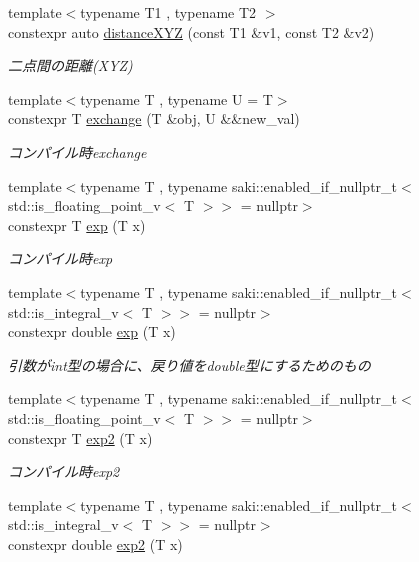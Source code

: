 \begin{DoxyCompactItemize}
{\footnotesize template$<$typename T1 , typename T2 $>$ }\\constexpr auto \mbox{\hyperlink{namespacesaki_a456ead1dd3345def8268b21794ffde19}{distance\+X\+YZ}} (const T1 \&v1, const T2 \&v2)
\begin{DoxyCompactList}\small\item\em 二点間の距離(\+X\+Y\+Z) \end{DoxyCompactList}\item 
{\footnotesize template$<$typename T , typename U  = T$>$ }\\constexpr T \mbox{\hyperlink{namespacesaki_ace0188c33098d6ac615fc71e64ab6dda}{exchange}} (T \&obj, U \&\&new\+\_\+val)
\begin{DoxyCompactList}\small\item\em コンパイル時exchange \end{DoxyCompactList}\item 
{\footnotesize template$<$typename T , typename saki\+::enabled\+\_\+if\+\_\+nullptr\+\_\+t$<$ std\+::is\+\_\+floating\+\_\+point\+\_\+v$<$ T $>$$>$  = nullptr$>$ }\\constexpr T \mbox{\hyperlink{namespacesaki_abc1268e543a60d43b04f1418f5ef3e41}{exp}} (T x)
\begin{DoxyCompactList}\small\item\em コンパイル時exp \end{DoxyCompactList}\item 
{\footnotesize template$<$typename T , typename saki\+::enabled\+\_\+if\+\_\+nullptr\+\_\+t$<$ std\+::is\+\_\+integral\+\_\+v$<$ T $>$$>$  = nullptr$>$ }\\constexpr double \mbox{\hyperlink{namespacesaki_ab7883c6dfd2cf3ae04993f64d98345fc}{exp}} (T x)
\begin{DoxyCompactList}\small\item\em 引数がint型の場合に、戻り値をdouble型にするためのもの \end{DoxyCompactList}\item 
{\footnotesize template$<$typename T , typename saki\+::enabled\+\_\+if\+\_\+nullptr\+\_\+t$<$ std\+::is\+\_\+floating\+\_\+point\+\_\+v$<$ T $>$$>$  = nullptr$>$ }\\constexpr T \mbox{\hyperlink{namespacesaki_a2e2d4ba08357bbab05c97ae261c80343}{exp2}} (T x)
\begin{DoxyCompactList}\small\item\em コンパイル時exp2 \end{DoxyCompactList}\item 
{\footnotesize template$<$typename T , typename saki\+::enabled\+\_\+if\+\_\+nullptr\+\_\+t$<$ std\+::is\+\_\+integral\+\_\+v$<$ T $>$$>$  = nullptr$>$ }\\constexpr double \mbox{\hyperlink{namespacesaki_a35e9ce74a5f65c8d38a4901bf513ac1e}{exp2}} (T x)

\end{DoxyCompactItemize}
